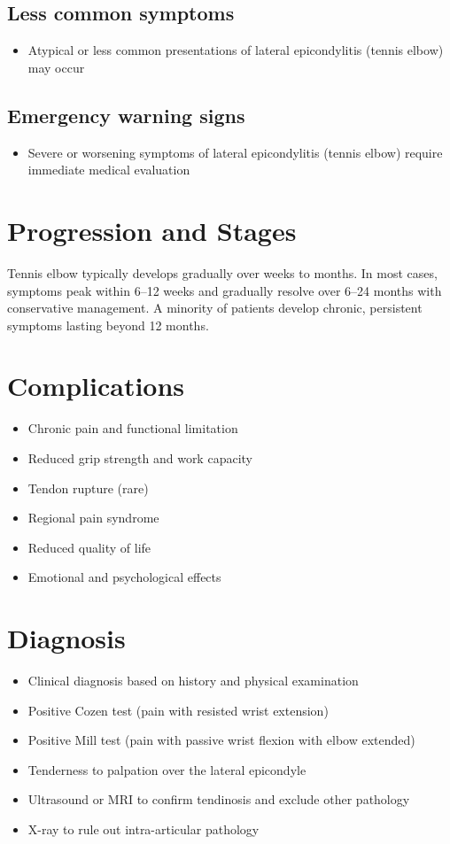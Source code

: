 \subsection{Less common symptoms}
\begin{itemize}[noitemsep]
  \item Atypical or less common presentations of lateral epicondylitis (tennis elbow) may occur
\end{itemize}

\subsection{Emergency warning signs}
\begin{itemize}[noitemsep]
  \item Severe or worsening symptoms of lateral epicondylitis (tennis elbow) require immediate medical evaluation
\end{itemize}
\section{Progression and Stages}
Tennis elbow typically develops gradually over weeks to months. In most cases, symptoms peak within 6--12 weeks and gradually resolve over 6--24 months with conservative management. A minority of patients develop chronic, persistent symptoms lasting beyond 12 months.

\section{Complications}

\begin{itemize}[noitemsep]
  \item Chronic pain and functional limitation
  \item Reduced grip strength and work capacity
  \item Tendon rupture (rare)
  \item Regional pain syndrome
  \item Reduced quality of life
  \item Emotional and psychological effects
\end{itemize}

\section{Diagnosis}

\begin{itemize}[noitemsep]
  \item Clinical diagnosis based on history and physical examination
  \item Positive Cozen test (pain with resisted wrist extension)
  \item Positive Mill test (pain with passive wrist flexion with elbow extended)
  \item Tenderness to palpation over the lateral epicondyle
  \item Ultrasound or MRI to confirm tendinosis and exclude other pathology
  \item X-ray to rule out intra-articular pathology
\end{itemize}

